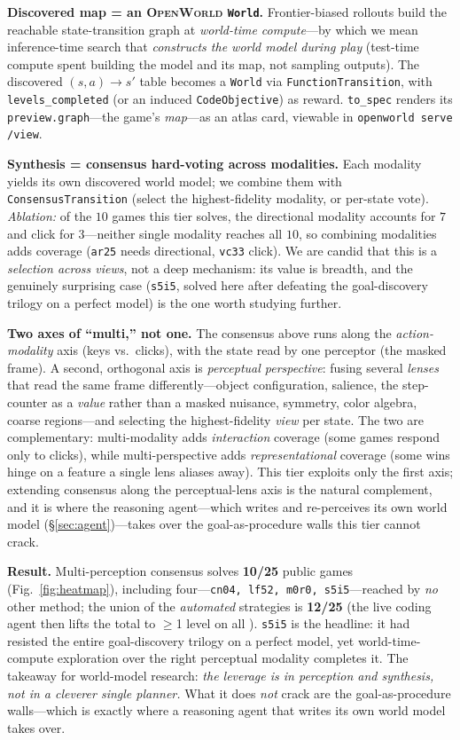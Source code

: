 \documentclass[11pt]{article}
\newcommand{\openworld}{\textsc{OpenWorld}}
\begin{document}
\textbf{Discovered map = an \openworld{} \texttt{World}.} Frontier-biased rollouts build the reachable
state-transition graph at \emph{world-time compute}---by which we mean inference-time search that
\emph{constructs the world model during play} (test-time compute spent building the model and its map,
not sampling outputs). The discovered $(s,a)\!\to\!s'$ table becomes a \texttt{World} via
\texttt{FunctionTransition}, with \texttt{levels\_completed} (or an induced \texttt{CodeObjective}) as
reward. \texttt{to\_spec} renders its \texttt{preview.graph}---the
game's \emph{map}---as an atlas card, viewable in \texttt{openworld serve /view}.

\textbf{Synthesis = consensus hard-voting across modalities.} Each modality yields its own discovered
world model; we combine them with \texttt{ConsensusTransition} (select the highest-fidelity modality,
or per-state vote). \emph{Ablation:} of the $10$ games this tier solves, the directional modality
accounts for $7$ and click for $3$---neither single modality reaches all $10$, so combining modalities
adds coverage (\texttt{ar25} needs directional, \texttt{vc33} click). We are candid that this is a
\emph{selection across views}, not a deep mechanism: its value is breadth, and the genuinely
surprising case (\texttt{s5i5}, solved here after defeating the goal-discovery trilogy on a perfect
model) is the one worth studying further.

\textbf{Two axes of ``multi,'' not one.} The consensus above runs along the \emph{action-modality} axis
(keys vs.\ clicks), with the state read by one perceptor (the masked frame). A second, orthogonal axis is
\emph{perceptual perspective}: fusing several \emph{lenses} that read the same frame differently---object
configuration, salience, the step-counter as a \emph{value} rather than a masked nuisance, symmetry, color
algebra, coarse regions---and selecting the highest-fidelity \emph{view} per state. The two are
complementary: multi-modality adds \emph{interaction} coverage (some games respond only to clicks), while
multi-perspective adds \emph{representational} coverage (some wins hinge on a feature a single lens aliases
away). This tier exploits only the first axis; extending consensus along the perceptual-lens axis is the
natural complement, and it is where the reasoning agent---which writes and re-perceives its own world
model (\S\ref{sec:agent})---takes over the goal-as-procedure walls this tier cannot crack.


\textbf{Result.} Multi-perception consensus solves \textbf{10/25} public games (Fig.~\ref{fig:heatmap}),
including four---\texttt{cn04, lf52, m0r0, s5i5}---reached by \emph{no} other method; the union of
the \emph{automated} strategies is \textbf{12/25} (the live coding agent then lifts the total to
$\geq$1 level on all \ArcUnionGames{}). \texttt{s5i5} is the headline: it had resisted the entire
goal-discovery trilogy on a perfect model, yet world-time-compute exploration over the right
perceptual modality completes it. The takeaway for world-model research: \emph{the leverage is in
perception and synthesis, not in a cleverer single planner.} What it does \emph{not} crack are the
goal-as-procedure walls---which is exactly where a reasoning agent that writes its own world model
takes over.
\end{document}
